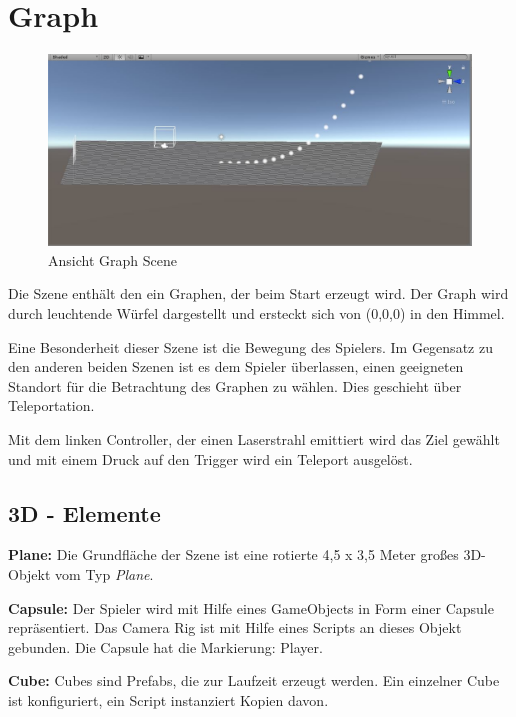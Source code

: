 \section{Graph}
\label{ graphScene }

\begin{figure}[h!]
	\includegraphics[scale=0.85]{bilder/graphScene.jpg}
	\caption{Ansicht Graph Scene}
\end{figure}

Die Szene enthält den ein Graphen, der beim Start erzeugt wird. Der Graph wird durch leuchtende Würfel dargestellt und ersteckt sich von (0,0,0) in \glqq den Himmel\grqq{}.

Eine Besonderheit dieser Szene ist die Bewegung des Spielers. Im Gegensatz zu den anderen beiden Szenen ist es dem Spieler überlassen, einen geeigneten Standort für die Betrachtung des Graphen zu wählen. Dies geschieht über Teleportation. 

Mit dem linken Controller, der einen Laserstrahl emittiert wird das Ziel gewählt und mit einem Druck auf den Trigger wird ein Teleport ausgelöst. 


\subsection{3D - Elemente}

\textbf{Plane: } Die Grundfläche der Szene ist eine rotierte 4,5 x 3,5 Meter großes 3D-Objekt vom Typ \emph{Plane}.

\textbf{Capsule: } Der Spieler wird mit Hilfe eines GameObjects in Form einer Capsule repräsentiert. Das Camera Rig ist mit Hilfe eines Scripts an dieses Objekt gebunden. Die Capsule hat die Markierung: Player.

\textbf{Cube: } Cubes sind Prefabs, die zur Laufzeit erzeugt werden. Ein einzelner Cube ist konfiguriert, ein Script instanziert Kopien davon.

